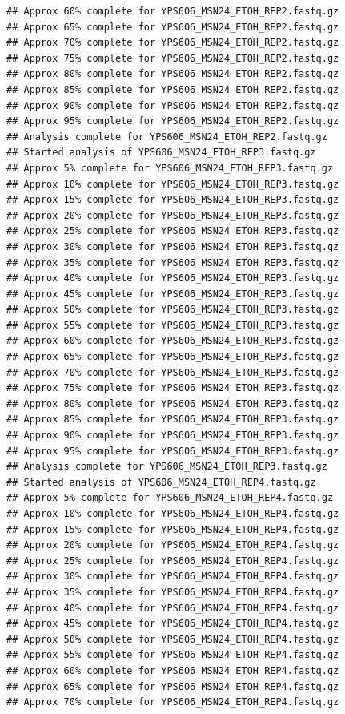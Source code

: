 \documentclass[
]{book}
\begin{document}
\begin{verbatim}
## Approx 60% complete for YPS606_MSN24_ETOH_REP2.fastq.gz
## Approx 65% complete for YPS606_MSN24_ETOH_REP2.fastq.gz
## Approx 70% complete for YPS606_MSN24_ETOH_REP2.fastq.gz
## Approx 75% complete for YPS606_MSN24_ETOH_REP2.fastq.gz
## Approx 80% complete for YPS606_MSN24_ETOH_REP2.fastq.gz
## Approx 85% complete for YPS606_MSN24_ETOH_REP2.fastq.gz
## Approx 90% complete for YPS606_MSN24_ETOH_REP2.fastq.gz
## Approx 95% complete for YPS606_MSN24_ETOH_REP2.fastq.gz
## Analysis complete for YPS606_MSN24_ETOH_REP2.fastq.gz
## Started analysis of YPS606_MSN24_ETOH_REP3.fastq.gz
## Approx 5% complete for YPS606_MSN24_ETOH_REP3.fastq.gz
## Approx 10% complete for YPS606_MSN24_ETOH_REP3.fastq.gz
## Approx 15% complete for YPS606_MSN24_ETOH_REP3.fastq.gz
## Approx 20% complete for YPS606_MSN24_ETOH_REP3.fastq.gz
## Approx 25% complete for YPS606_MSN24_ETOH_REP3.fastq.gz
## Approx 30% complete for YPS606_MSN24_ETOH_REP3.fastq.gz
## Approx 35% complete for YPS606_MSN24_ETOH_REP3.fastq.gz
## Approx 40% complete for YPS606_MSN24_ETOH_REP3.fastq.gz
## Approx 45% complete for YPS606_MSN24_ETOH_REP3.fastq.gz
## Approx 50% complete for YPS606_MSN24_ETOH_REP3.fastq.gz
## Approx 55% complete for YPS606_MSN24_ETOH_REP3.fastq.gz
## Approx 60% complete for YPS606_MSN24_ETOH_REP3.fastq.gz
## Approx 65% complete for YPS606_MSN24_ETOH_REP3.fastq.gz
## Approx 70% complete for YPS606_MSN24_ETOH_REP3.fastq.gz
## Approx 75% complete for YPS606_MSN24_ETOH_REP3.fastq.gz
## Approx 80% complete for YPS606_MSN24_ETOH_REP3.fastq.gz
## Approx 85% complete for YPS606_MSN24_ETOH_REP3.fastq.gz
## Approx 90% complete for YPS606_MSN24_ETOH_REP3.fastq.gz
## Approx 95% complete for YPS606_MSN24_ETOH_REP3.fastq.gz
## Analysis complete for YPS606_MSN24_ETOH_REP3.fastq.gz
## Started analysis of YPS606_MSN24_ETOH_REP4.fastq.gz
## Approx 5% complete for YPS606_MSN24_ETOH_REP4.fastq.gz
## Approx 10% complete for YPS606_MSN24_ETOH_REP4.fastq.gz
## Approx 15% complete for YPS606_MSN24_ETOH_REP4.fastq.gz
## Approx 20% complete for YPS606_MSN24_ETOH_REP4.fastq.gz
## Approx 25% complete for YPS606_MSN24_ETOH_REP4.fastq.gz
## Approx 30% complete for YPS606_MSN24_ETOH_REP4.fastq.gz
## Approx 35% complete for YPS606_MSN24_ETOH_REP4.fastq.gz
## Approx 40% complete for YPS606_MSN24_ETOH_REP4.fastq.gz
## Approx 45% complete for YPS606_MSN24_ETOH_REP4.fastq.gz
## Approx 50% complete for YPS606_MSN24_ETOH_REP4.fastq.gz
## Approx 55% complete for YPS606_MSN24_ETOH_REP4.fastq.gz
## Approx 60% complete for YPS606_MSN24_ETOH_REP4.fastq.gz
## Approx 65% complete for YPS606_MSN24_ETOH_REP4.fastq.gz
## Approx 70% complete for YPS606_MSN24_ETOH_REP4.fastq.gz

\end{verbatim}
\end{document}
